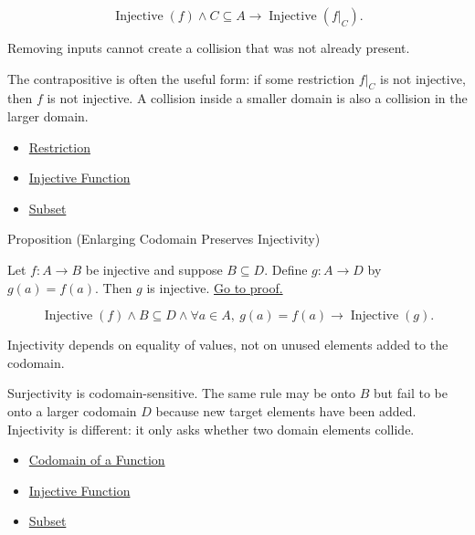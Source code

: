 \begin{remark*}
\[
  \operatorname{Injective}(f)
  \wedge C\subseteq A
  \to
  \operatorname{Injective}(f|_C).
\]
\end{remark*}

\begin{remark*}[Interpretation]
Removing inputs cannot create a collision that was not already present.
\end{remark*}

\begin{remark*}[Exposition]
The contrapositive is often the useful form: if some restriction $f|_C$ is not
injective, then $f$ is not injective. A collision inside a smaller domain is
also a collision in the larger domain.
\end{remark*}

\begin{dependencies}
\begin{itemize}
  \item \hyperref[def:restriction]{Restriction}
  \item \hyperref[def:injective]{Injective Function}
  \item \hyperref[def:subset]{Subset}
\end{itemize}
\end{dependencies}

\begin{propositionbox}{Proposition (Enlarging Codomain Preserves Injectivity)}
\begin{proposition}\label{prop:enlarge-codomain-preserves-injective}
Let $f:A\to B$ be injective and suppose $B\subseteq D$. Define
$g:A\to D$ by $g(a)=f(a)$. Then $g$ is injective.
\hyperref[prf:enlarge-codomain-preserves-injective]{Go to proof.}
\end{proposition}
\end{propositionbox}

\begin{remark*}
\[
  \operatorname{Injective}(f)
  \wedge B\subseteq D
  \wedge \forall a\in A,\ g(a)=f(a)
  \to
  \operatorname{Injective}(g).
\]
\end{remark*}

\begin{remark*}[Interpretation]
Injectivity depends on equality of values, not on unused elements added to the
codomain.
\end{remark*}

\begin{remark*}[Exposition]
Surjectivity is codomain-sensitive. The same rule may be onto $B$ but fail to
be onto a larger codomain $D$ because new target elements have been added.
Injectivity is different: it only asks whether two domain elements collide.
\end{remark*}

\begin{dependencies}
\begin{itemize}
  \item \hyperref[def:codomain]{Codomain of a Function}
  \item \hyperref[def:injective]{Injective Function}
  \item \hyperref[def:subset]{Subset}
\end{itemize}
\end{dependencies}

